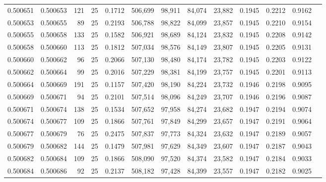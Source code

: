 \begin{tabular}{rrrrrrrrrrrrr}
0.500651 & 0.500653 & 121 &  25 &                                     0.1712 & 506,699 &  98,911 &  84,074 &  23,882 & 0.1945 & 0.2212 & 0.9162 \\
0.500653 & 0.500655 &  89 &  25 &                                     0.2193 & 506,788 &  98,822 &  84,099 &  23,857 & 0.1945 & 0.2210 & 0.9154 \\
0.500655 & 0.500658 & 133 &  25 &                                     0.1582 & 506,921 &  98,689 &  84,124 &  23,832 & 0.1945 & 0.2208 & 0.9142 \\
0.500658 & 0.500660 & 113 &  25 &                                     0.1812 & 507,034 &  98,576 &  84,149 &  23,807 & 0.1945 & 0.2205 & 0.9131 \\
0.500660 & 0.500662 &  96 &  25 &                                     0.2066 & 507,130 &  98,480 &  84,174 &  23,782 & 0.1945 & 0.2203 & 0.9122 \\
0.500662 & 0.500664 &  99 &  25 &                                     0.2016 & 507,229 &  98,381 &  84,199 &  23,757 & 0.1945 & 0.2201 & 0.9113 \\
0.500664 & 0.500669 & 191 &  25 &                                     0.1157 & 507,420 &  98,190 &  84,224 &  23,732 & 0.1946 & 0.2198 & 0.9095 \\
0.500669 & 0.500671 &  94 &  25 &                                     0.2101 & 507,514 &  98,096 &  84,249 &  23,707 & 0.1946 & 0.2196 & 0.9087 \\
0.500671 & 0.500674 & 138 &  25 &                                     0.1534 & 507,652 &  97,958 &  84,274 &  23,682 & 0.1947 & 0.2194 & 0.9074 \\
0.500674 & 0.500677 & 109 &  25 &                                     0.1866 & 507,761 &  97,849 &  84,299 &  23,657 & 0.1947 & 0.2191 & 0.9064 \\
0.500677 & 0.500679 &  76 &  25 &                                     0.2475 & 507,837 &  97,773 &  84,324 &  23,632 & 0.1947 & 0.2189 & 0.9057 \\
0.500679 & 0.500682 & 144 &  25 &                                     0.1479 & 507,981 &  97,629 &  84,349 &  23,607 & 0.1947 & 0.2187 & 0.9043 \\
0.500682 & 0.500684 & 109 &  25 &                                     0.1866 & 508,090 &  97,520 &  84,374 &  23,582 & 0.1947 & 0.2184 & 0.9033 \\
0.500684 & 0.500686 &  92 &  25 &                                     0.2137 & 508,182 &  97,428 &  84,399 &  23,557 & 0.1947 & 0.2182 & 0.9025 \\

\end{tabular}

